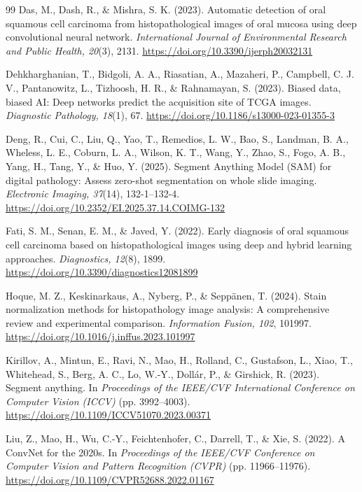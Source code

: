 \documentclass[10pt,twocolumn]{article}
\begin{document}
\begin{thebibliography}{99}
Das, M., Dash, R., \& Mishra, S. K. (2023). Automatic detection of oral squamous cell carcinoma from histopathological images of oral mucosa using deep convolutional neural network. \textit{International Journal of Environmental Research and Public Health, 20}(3), 2131. \url{https://doi.org/10.3390/ijerph20032131}

Dehkharghanian, T., Bidgoli, A. A., Riasatian, A., Mazaheri, P., Campbell, C. J. V., Pantanowitz, L., Tizhoosh, H. R., \& Rahnamayan, S. (2023). Biased data, biased AI: Deep networks predict the acquisition site of TCGA images. \textit{Diagnostic Pathology, 18}(1), 67. \url{https://doi.org/10.1186/s13000-023-01355-3}

Deng, R., Cui, C., Liu, Q., Yao, T., Remedios, L. W., Bao, S., Landman, B. A., Wheless, L. E., Coburn, L. A., Wilson, K. T., Wang, Y., Zhao, S., Fogo, A. B., Yang, H., Tang, Y., \& Huo, Y. (2025). Segment Anything Model (SAM) for digital pathology: Assess zero-shot segmentation on whole slide imaging. \textit{Electronic Imaging, 37}(14), 132-1--132-4. \url{https://doi.org/10.2352/EI.2025.37.14.COIMG-132}

Fati, S. M., Senan, E. M., \& Javed, Y. (2022). Early diagnosis of oral squamous cell carcinoma based on histopathological images using deep and hybrid learning approaches. \textit{Diagnostics, 12}(8), 1899. \url{https://doi.org/10.3390/diagnostics12081899}

Hoque, M. Z., Keskinarkaus, A., Nyberg, P., \& Sepp\"anen, T. (2024). Stain normalization methods for histopathology image analysis: A comprehensive review and experimental comparison. \textit{Information Fusion, 102}, 101997. \url{https://doi.org/10.1016/j.inffus.2023.101997}

Kirillov, A., Mintun, E., Ravi, N., Mao, H., Rolland, C., Gustafson, L., Xiao, T., Whitehead, S., Berg, A. C., Lo, W.-Y., Doll\'ar, P., \& Girshick, R. (2023). Segment anything. In \textit{Proceedings of the IEEE/CVF International Conference on Computer Vision (ICCV)} (pp. 3992--4003). \url{https://doi.org/10.1109/ICCV51070.2023.00371}

Liu, Z., Mao, H., Wu, C.-Y., Feichtenhofer, C., Darrell, T., \& Xie, S. (2022). A ConvNet for the 2020s. In \textit{Proceedings of the IEEE/CVF Conference on Computer Vision and Pattern Recognition (CVPR)} (pp. 11966--11976). \url{https://doi.org/10.1109/CVPR52688.2022.01167}


\end{thebibliography}
\end{document}
